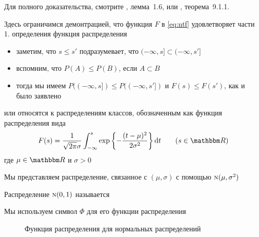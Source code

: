 \begin{frame}

    \vspace{2em}
    Для полного доказательства, смотрите \cite{williams1991probability}, лемма~1.6,
    или \cite{dudley2002real}, теорема~9.1.1.
    
    Здесь ограничимся демонтрацией, что функция $F$ в
    \eqref{eq:ntf} удовлетворяет части 1. определения функция распределения
    
    \begin{itemize}
        \item заметим, что 
    	$s \leq s'$ подразумевает, что $(-\infty, s] \subset (-\infty, s']$
        \item вспомним, что $P(A)\leq P(B)$, если $A\subset B$ 
        \item тогда мы имеем $P((-\infty, s]) \leq P((-\infty, s'])$
        и $F(s) \leq F(s')$, как и было заявлено
    \end{itemize}
 
\end{frame}

\begin{frame}

    \vspace{2em}
    \Eg
     или  относятся к распределениям классов, обозначенным как функция распределения вида
    \begin{equation*}
        F(s) =
        \frac{1}{\sqrt{2 \pi} \sigma}
        \int_{-\infty}^s
           \exp \left\{ - 
               \frac{(t - \mu)^2}{2\sigma^2} \right\} \diff t
       \qquad (s \in \RR)
    \end{equation*}
   где $\mu \in \RR$ и $\sigma > 0$
    
    Мы представляем распределение, связанное с $(\mu, \sigma)$ с помощью $\textrm{\sc n}(\mu, \sigma^2)$
    
    Распределение $\textrm{\sc n}(0, 1)$ называется 
    
    Мы используем символ $\Phi$ для его функции распределения
    
\end{frame}

\begin{frame}

    \begin{figure}
   \begin{center}
    \caption{\label{f:normal_cdfs} Функция распределения для нормальных распределений }
   \end{center}
    \end{figure}
    
\end{frame}


